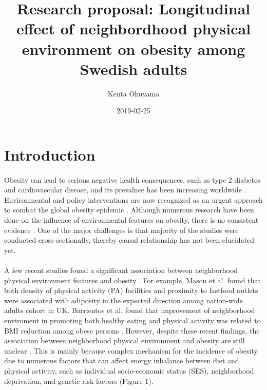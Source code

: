 \documentclass[12]{article}
\title{Research proposal: Longitudinal effect of neighbordhood physical environment on obesity among Swedish adults}
\date{2019-02-25}
\author{Kenta Okuyama}
\begin{document}

\maketitle
\tableofcontents
\newpage
{}
  
\section{Introduction} %
\paragraph{}
Obesity can lead to serious negative health consequences, such as type 2 diabetes and cardiovascular disease, and its prevalnce has been increasing worldwide \cite{ng2014global,flegal2002prevalence}. Environmental and policy interventions are now recognized as an urgent approach to combat the global obesity epidemic \cite{gortmaker2011changing}. Although numerous research have been done on the influence of environmental features on obesity, there is no consistent evidence \cite{papas2007built,mackenbach2014obesogenic}. One of the major challenges is that majority of the studies were conducted cross-sectionally, thereby causal relationship has not been elucidated yet. \paragraph{}
A few recent studies found a significant association between neighborhood  physical environment features and obesity \cite{mason2018associations,barrientos2017neighborhood}. For example, Mason et al. found that both density of physical activity (PA) facilities and proximity to fastfood outlets were associated with adiposity in the expected direction among nation-wide adults cohort in UK. Barrientos et al. found that improvement of neighborhood enviroment in promoting both healthy eating and physical activity was related to BMI reduction among obese persons \cite{barrientos2017neighborhood}. However, despite these recent findings, the association between neighborhood physical environment and obesity are still unclear \cite{nieuwenhuijsen2018influence}. This is mainly because complex mechanism for the incidence of obesity due to numerous factors that can affect energy inbalance between diet and physical activity, such as individual socio-economic status (SES), neighborhood deprivation, and genetic risk factors (Figure 1). 
\end{document}
